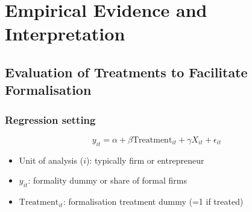 \section{Empirical Evidence and Interpretation}

    \subsection{Evaluation of Treatments to Facilitate Formalisation}
        \subsubsection{Regression setting}
            \begin{equation}
                y_{it}=\alpha+ \beta \text{Treatment}_{it} +\gamma X_{it}+\epsilon_{it}
                \label{eqn:formality regression 1}
            \end{equation}
            \begin{itemize}
                \item Unit of analysis ($i$): typically firm or entrepreneur
                \item $y_{it}$: formality dummy or share of formal firms
                \item $\text{Treatment}_{it}$: formalisation treatment dummy (=1 if treated)
            \end{itemize}
